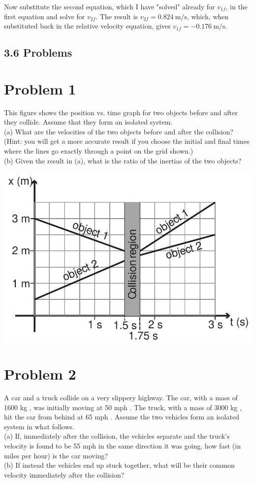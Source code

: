 \documentclass[10pt]{article}
\begin{document}
Now substitute the second equation, which I have "solved" already for $v_{1 f}$, in the first equation and solve for $v_{2 f}$. The result is $v_{2 f}=0.824 \mathrm{~m} / \mathrm{s}$, which, when substituted back in the relative velocity equation, gives $v_{1 f}=-0.176 \mathrm{~m} / \mathrm{s}$.

\subsection*{3.6 Problems}
\section*{Problem 1}
This figure shows the position vs. time graph for two objects before and after they collide. Assume that they form an isolated system.\\
(a) What are the velocities of the two objects before and after the collision? (Hint: you will get a more accurate result if you choose the initial and final times where the lines go exactly through a point on the grid shown.)\\
(b) Given the result in (a), what is the ratio of the inertias of the two objects?

\begin{center}
\includegraphics[max width=\textwidth]{2024_09_14_9969b06773f10b6936e8g-085}
\end{center}

\section*{Problem 2}
A car and a truck collide on a very slippery highway. The car, with a mass of 1600 kg , was initially moving at 50 mph . The truck, with a mass of 3000 kg , hit the car from behind at 65 mph . Assume the two vehicles form an isolated system in what follows.\\
(a) If, immediately after the collision, the vehicles separate and the truck's velocity is found to be 55 mph in the same direction it was going, how fast (in miles per hour) is the car moving?\\
(b) If instead the vehicles end up stuck together, what will be their common velocity immediately after the collision?
\end{document}
